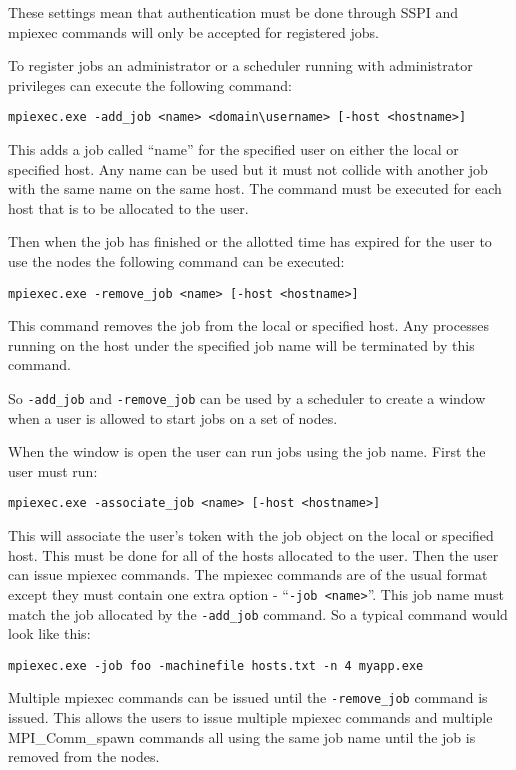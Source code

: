 \documentclass[dvipdfm,11pt]{article}
\begin{document}
These settings mean that authentication must be done through SSPI and mpiexec commands will only be
accepted for registered jobs.

To register jobs an administrator or a scheduler running with administrator privileges can execute
the following command:
\begin{verbatim}
mpiexec.exe -add_job <name> <domain\username> [-host <hostname>]
\end{verbatim}
This adds a job called ``name'' for the specified user on either the local or specified host.  Any
name can be used but it must not collide with another job with the same name on the same host.  The
command must be executed for each host that is to be allocated to the user.

Then when the job has finished or the allotted time has expired for the user to use the nodes the 
following command can be executed:
\begin{verbatim}
mpiexec.exe -remove_job <name> [-host <hostname>]
\end{verbatim}
This command removes the job from the local or specified host.  Any processes running on the host 
under the specified job name will be terminated by this command.

So \texttt{-add\_job} and \texttt{-remove\_job} can be used by a scheduler to create a window when a user is allowed to
start jobs on a set of nodes.

When the window is open the user can run jobs using the job name.  First the user must run:
\begin{verbatim}
mpiexec.exe -associate_job <name> [-host <hostname>]
\end{verbatim}
This will associate the user's token with the job object on the local or
specified host.  This must be done for all of the hosts allocated to the user.  Then the user can issue
mpiexec commands.  The mpiexec commands are of the usual format except they must contain one extra option -
``\texttt{-job <name>}''.  This job name must match the job allocated by the \texttt{-add\_job} command.  So a typical command
would look like this:
\begin{verbatim}
mpiexec.exe -job foo -machinefile hosts.txt -n 4 myapp.exe
\end{verbatim}
Multiple mpiexec commands can be issued until the \texttt{-remove\_job} command is issued.
This allows the users to issue multiple 
mpiexec commands and multiple MPI\_Comm\_spawn commands all using the same job name until the job is removed
from the nodes.
\end{document}
